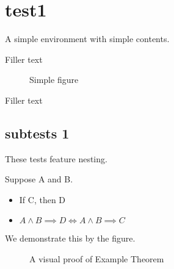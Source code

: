 \documentclass{memoir}
\begin{document}
\section{test1}
\label{sec:test1}

\begin{defn}[Definition 1]
\label{defn:definition_1}
A simple environment with simple contents.
\end{defn}

Filler text

\begin{figure}[ht] %
    \centering
%     
    \caption{Simple figure}
    \label{fig:simple_figure}
\end{figure}

Filler text

\subsection{subtests 1}
\label{sub:subtests_1}

These tests feature nesting.

\begin{thm}
\label{thm:example_title_of_theorem}
Suppose A and B.

	 \begin{itemize}
		\item If C, then D
		\item \(A \wedge B \implies D \iff A \wedge B \implies C\)
	\end{itemize}

	We demonstrate this by the figure.
\begin{figure}[ht] %
    \centering
%     
    \caption{A visual proof of Example Theorem}
    \label{fig:visual_theorem}
\end{figure}

\end{thm}
\end{document}

